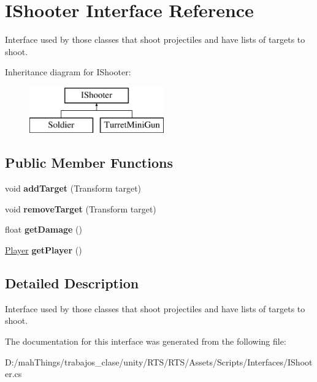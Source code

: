 \hypertarget{interface_i_shooter}{}\section{I\+Shooter Interface Reference}
\label{interface_i_shooter}


Interface used by those classes that shoot projectiles and have lists of targets to shoot.  


Inheritance diagram for I\+Shooter\+:\begin{figure}[H]
\begin{center}
\leavevmode
\includegraphics[height=2.000000cm]{interface_i_shooter}
\end{center}
\end{figure}
\subsection*{Public Member Functions}
\begin{DoxyCompactItemize}
\item 
\mbox{\label{interface_i_shooter_a6198ba85eef3982179f87c91c3eb0123}} 
void {\bfseries add\+Target} (Transform target)
\item 
\mbox{\label{interface_i_shooter_ac830dd8557508e6ac804792889d7186d}} 
void {\bfseries remove\+Target} (Transform target)
\item 
\mbox{\label{interface_i_shooter_add904450817a7a4eabc6d79a901ae097}} 
float {\bfseries get\+Damage} ()
\item 
\mbox{\label{interface_i_shooter_a07962162479f4f4d63568d17877c9e63}} 
\mbox{\hyperlink{class_player}{Player}} {\bfseries get\+Player} ()
\end{DoxyCompactItemize}


\subsection{Detailed Description}
Interface used by those classes that shoot projectiles and have lists of targets to shoot. 



The documentation for this interface was generated from the following file\+:\begin{DoxyCompactItemize}
\item 
D\+:/mah\+Things/trabajos\+\_\+clase/unity/\+R\+T\+S/\+R\+T\+S/\+Assets/\+Scripts/\+Interfaces/I\+Shooter.\+cs\end{DoxyCompactItemize}
